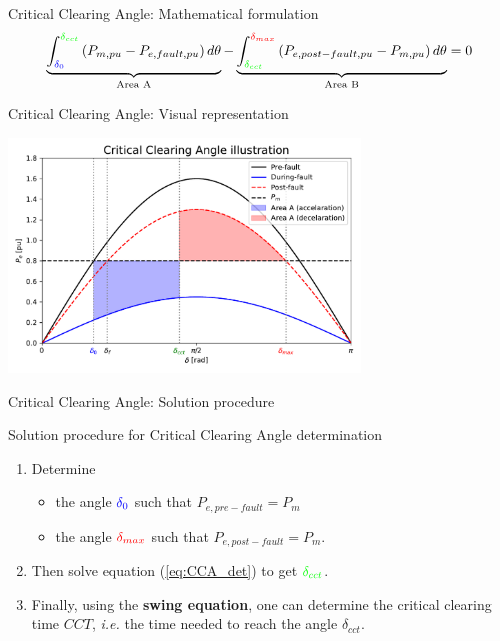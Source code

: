 \begin{frame}{Critical Clearing Angle: Mathematical formulation}
\begin{equation}
\underbrace{\int_{\mathcolor{blue}{\delta_0}}^{\mathcolor{green}{\delta_{cct}}} \left(P_{m,pu}-P_{e,fault,pu}\right) d\theta}_{\text{Area A}} - \underbrace{\int_{\mathcolor{green}{\delta_{cct}}}^{\mathcolor{red}{\delta_{max}}} \left(P_{e,post-fault,pu}-P_{m,pu}\right) d\theta}_{\text{Area B}} = 0  \label{eq:CCA_det}
\end{equation}
\end{frame}

\begin{frame}{Critical Clearing Angle:  Visual representation}


\begin{center}
\includegraphics[width=0.7\textwidth]{images/CCT_max.pdf}
\end{center}


\end{frame}

\begin{frame}{Critical Clearing Angle: Solution procedure}
\begin{block}{Solution procedure for Critical Clearing Angle determination}
\begin{enumerate}
    \item Determine 
    \begin{itemize}
        \item the angle $\color{blue}{\delta_0}$ such that $P_{e,pre-fault} = P_{m}$
        \item the angle $\color{red}{\delta_{max}}$ such that $P_{e,post-fault} = P_{m}$. 
    \end{itemize}
    \item Then solve equation (\ref{eq:CCA_det}) to get $\color{green}{\delta_{cct}}$. 
    \item Finally, using the \textbf{swing equation}, one can determine the critical clearing time $CCT$, \emph{i.e.} the time needed to reach the angle $\delta_{cct}$.
\end{enumerate}
\end{block}

\end{frame}

